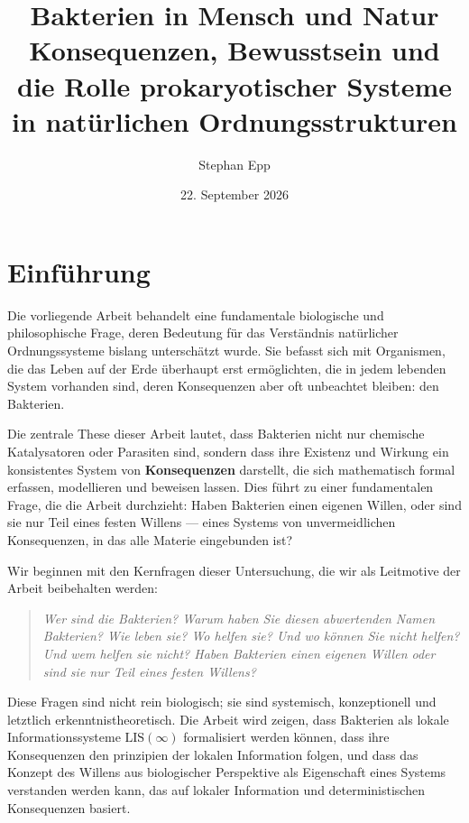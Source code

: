 \documentclass[a4paper,12pt]{article}
\title{\textbf{Bakterien in Mensch und Natur}\\Konsequenzen, Bewusstsein und die Rolle prokaryotischer Systeme\\in natürlichen Ordnungsstrukturen}
\author{Stephan Epp}
\date{22. September 2026}
\theoremstyle{definition}
\begin{document}
\maketitle
\tableofcontents
\newpage

\section{Einführung}

Die vorliegende Arbeit behandelt eine fundamentale biologische und philosophische Frage, deren Bedeutung für das Verständnis natürlicher Ordnungssysteme bislang unterschätzt wurde. Sie befasst sich mit Organismen, die das Leben auf der Erde überhaupt erst ermöglichten, die in jedem lebenden System vorhanden sind, deren Konsequenzen aber oft unbeachtet bleiben: den Bakterien.

Die zentrale These dieser Arbeit lautet, dass Bakterien nicht nur chemische Katalysatoren oder Parasiten sind, sondern dass ihre Existenz und Wirkung ein konsistentes System von \textbf{Konsequenzen} darstellt, die sich mathematisch formal erfassen, modellieren und beweisen lassen. Dies führt zu einer fundamentalen Frage, die die Arbeit durchzieht: Haben Bakterien einen eigenen Willen, oder sind sie nur Teil eines festen Willens --- eines Systems von unvermeidlichen Konsequenzen, in das alle Materie eingebunden ist?

Wir beginnen mit den Kernfragen dieser Untersuchung, die wir als Leitmotive der Arbeit beibehalten werden:

\begin{quote}
\textit{Wer sind die Bakterien? Warum haben Sie diesen abwertenden Namen Bakterien? Wie leben sie? Wo helfen sie? Und wo können Sie nicht helfen? Und wem helfen sie nicht? Haben Bakterien einen eigenen Willen oder sind sie nur Teil eines festen Willens?}
\end{quote}

Diese Fragen sind nicht rein biologisch; sie sind systemisch, konzeptionell und letztlich erkenntnistheoretisch. Die Arbeit wird zeigen, dass Bakterien als lokale Informationssysteme $\text{LIS}(\infty)$ formalisiert werden können, dass ihre Konsequenzen den prinzipien der lokalen Information folgen, und dass das Konzept des Willens aus biologischer Perspektive als Eigenschaft eines Systems verstanden werden kann, das auf lokaler Information und deterministischen Konsequenzen basiert.
\end{document}
